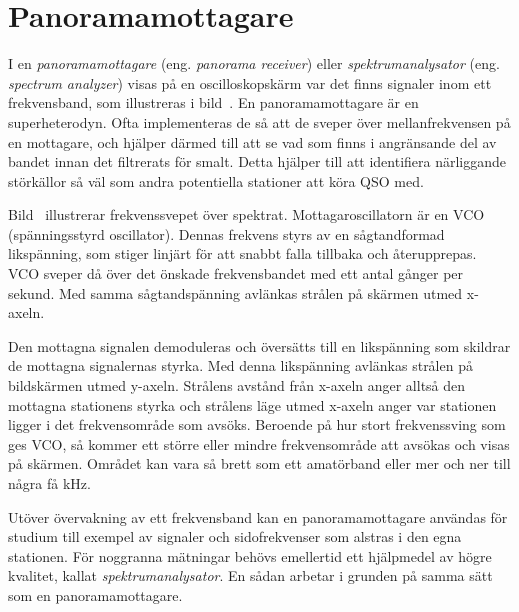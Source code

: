 \section{Panoramamottagare}


I en \emph{panoramamottagare} (eng. \emph{panorama receiver}) eller
\emph{spektrumanalysator} (eng. \emph{spectrum analyzer}) visas på en
oscilloskopskärm var det finns signaler inom ett frekvensband, som illustreras
i bild~.
En panoramamottagare är en superheterodyn.
Ofta implementeras de så att de sveper över mellanfrekvensen på en mottagare,
och hjälper därmed till att se vad som finns i angränsande del av bandet innan
det filtrerats för smalt.
Detta hjälper till att identifiera närliggande störkällor så väl som andra
potentiella stationer att köra QSO med.


Bild~ illustrerar frekvenssvepet över spektrat.
Mottagaroscillatorn är en VCO (spänningsstyrd oscillator).
Dennas frekvens styrs av en sågtandformad likspänning, som stiger linjärt för
att snabbt falla tillbaka och återupprepas.
VCO sveper då över det önskade frekvensbandet med ett antal gånger per sekund.
Med samma sågtandspänning avlänkas strålen på skärmen utmed x-axeln.

Den mottagna signalen demoduleras och översätts till en likspänning
som skildrar de mottagna signalernas styrka.
Med denna likspänning avlänkas strålen på bildskärmen utmed y-axeln.
Strålens avstånd från x-axeln anger alltså den mottagna stationens styrka
och strålens läge utmed x-axeln anger var stationen ligger i det
frekvensområde som avsöks.
Beroende på hur stort frekvenssving som ges VCO, så kommer ett större eller
mindre frekvensområde att avsökas och visas på skärmen.
Området kan vara så brett som ett amatörband eller mer och ner till några
få \unit{\kilo\hertz}.

Utöver övervakning av ett frekvensband kan en panoramamottagare användas för
studium till exempel av signaler och sidofrekvenser som alstras i den egna
stationen.
För noggranna mätningar behövs emellertid ett hjälpmedel av högre kvalitet,
kallat \emph{spektrumanalysator}.
En sådan arbetar i grunden på samma sätt som en panoramamottagare.

